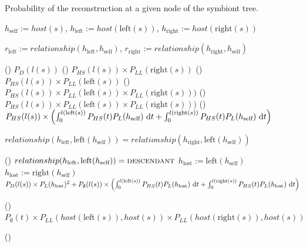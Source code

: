 \documentclass[12pt,letterpaper]{article}
\begin{document}
\begin{algorithm}
\caption{Probability of the reconstruction at a given node of the symbiont tree.}


$h_\text{self} := host(s)$, $h_\text{left} := host(\text{left}(s))$, $h_\text{right} := host(\text{right}(s))$\;

$r_\text{left} := relationship(h_\text{left},h_\text{self})$, $r_\text{right} := relationship(h_\text{right},h_\text{self})$\;

\uIf
()
{}
{
\Return $P_D(l(s))$\;}
\uElseIf
()
{}
{
\Return $P_{HS}(l(s)) \times P_{LL}(\text{right}(s))$\;}
\uElseIf
()
{}
{\Return $P_{HS}(l(s)) \times P_{LL}(\text{left}(s))$\;}
\uElseIf
()
{}
{
\Return $P_{HS}(l(s)) \times P_{LL}(\text{left}(s)) \times P_{LL}(\text{right}(s)))$\;}
\uElseIf
()
{}
{\Return $P_{HS}(l(s)) \times P_{LL}(\text{left}(s)) \times P_{LL}(\text{right}(s)))$\;}
\uElseIf
()
{}
{
\Return $P_{HS}(l(s)) \times \left(\int_0^{l(\text{left}(s))} P_{HS}(t) P_L(h_\text{self}) \,\dif t + \int_0^{l(\text{right}(s))} P_{HS}(t) P_L(h_\text{self}) \,\dif t \right)$\;}
\uElseIf
{}
{
\uIf
{$relationship(h_\text{left},\text{left}(h_\text{self})) = relationship(h_\text{right},\text{left}(h_\text{self}))$}
{
\uIf()
{$relationship(h_\text{left},\text{left}(h_\text{self})) = \text{\textsc{descendant}}$}
{$h_\text{lost} := \text{left}(h_\text{self})$}
\Else
{$h_\text{lost} := \text{right}(h_\text{self})$}
\Return $P_D(l(s)) \times P_L(h_\text{lost})^2 + P_\emptyset(l(s)) \times \left(\int_0^{l(\text{left}(s))} P_{HS}(t) P_L(h_\text{lost}) \,\dif t + \int_0^{l(\text{right}(s))} P_{HS}(t) P_L(h_\text{lost}) \,\dif t \right)$\;

}
\Else
()
{\Return $P_\emptyset(t) \times P_{LL}(host(\text{left}(s)), host(s)) \times P_{LL}(host(\text{right}(s)), host(s))$\;
}
}
\Else
()
{\;}

\end{algorithm}
\end{document}
